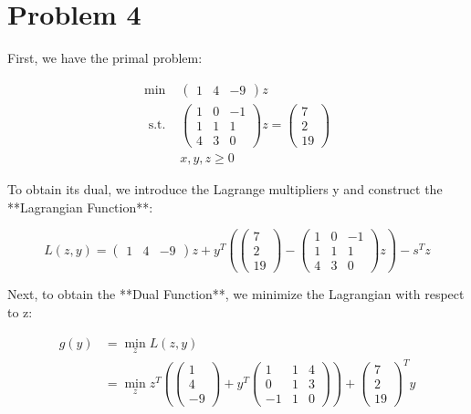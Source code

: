 \documentclass[12pt]{article}
\begin{document}
\clearpage
\section{Problem 4}

First, we have the primal problem:

\[
\begin{array}{cc}
\min & \left( \begin{array}{ccc} 1 & 4 & -9 \end{array} \right) z \\
\text { s.t. } & \left( \begin{array}{ccc} 1 & 0 & -1 \\ 1 & 1 & 1 \\ 4 & 3 & 0 \end{array} \right) z = \left( \begin{array}{c} 7 \\ 2 \\ 19 \end{array} \right) \\
& x, y, z \geq 0
\end{array}
\]

To obtain its dual, we introduce the Lagrange multipliers y and construct the **Lagrangian Function**:

\[ L(z,y) = \left( \begin{array}{ccc} 1 & 4 & -9 \end{array} \right) z + y^T \left( \left( \begin{array}{c} 7 \\ 2 \\ 19 \end{array} \right) - \left( \begin{array}{ccc} 1 & 0 & -1 \\ 1 & 1 & 1 \\ 4 & 3 & 0 \end{array} \right) z \right)  - s^T z
\]

Next, to obtain the **Dual Function**, we minimize the Lagrangian with respect to z:

\[
\begin{aligned}
g(y) &= \min_{z} L(z,y)  \\
&= \min_{z} z^T \left( \left( \begin{array}{c} 1 \\ 4 \\ -9 \end{array} \right) + y^T \left(\begin{array}{rrr}
1 & 1 & 4 \\
0 & 1 & 3 \\
-1 & 1 & 0
\end{array}\right) \right)  + \left( \begin{array}{c} 7 \\ 2 \\ 19 \end{array} \right)^T y 
\end{aligned}
\]
\end{document}
